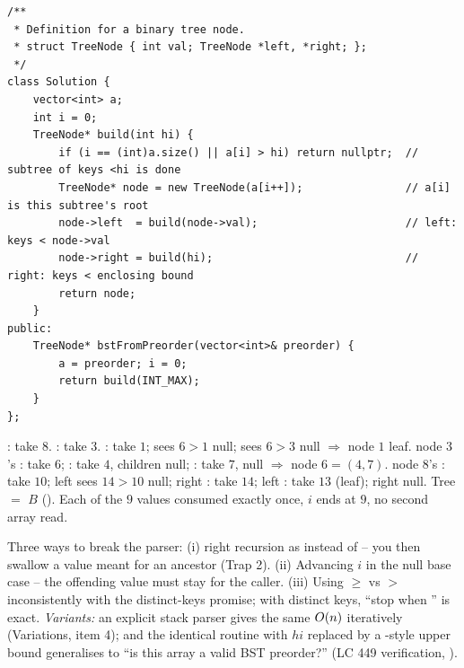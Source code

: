 \begin{lstlisting}[caption={Construct BST from Preorder Traversal -- submittable bound-descent parser (LeetCode 1008)}, label={lst:c05-construct}]
/**
 * Definition for a binary tree node.
 * struct TreeNode { int val; TreeNode *left, *right; };
 */
class Solution {
    vector<int> a;
    int i = 0;
    TreeNode* build(int hi) {
        if (i == (int)a.size() || a[i] > hi) return nullptr;  // subtree of keys <hi is done
        TreeNode* node = new TreeNode(a[i++]);                // a[i] is this subtree's root
        node->left  = build(node->val);                       // left: keys < node->val
        node->right = build(hi);                              // right: keys < enclosing bound
        return node;
    }
public:
    TreeNode* bstFromPreorder(vector<int>& preorder) {
        a = preorder; i = 0;
        return build(INT_MAX);
    }
};
\end{lstlisting}

\begin{tracebox}
: take $8$. : take $3$. : take $1$; 
sees $6>1$ null;  sees $6>3$ null $\Rightarrow$ node $1$ leaf. node $3$'s
: take $6$; : take $4$, children null; : take $7$, null
$\Rightarrow$ node $6=(4,7)$. node $8$'s : take $10$; left  sees
$14>10$ null; right : take $14$; left : take $13$ (leaf); right null.
Tree $=$ $B$ (). \checkmark Each of the $9$ values consumed exactly once, $i$ ends
at $9$, no second array read.
\end{tracebox}


\begin{warningbox}
Three ways to break the parser: (i) right recursion as  instead of
 -- you then swallow a value meant for an ancestor (Trap 2). (ii) Advancing $i$ in the
null base case -- the offending value must stay for the caller. (iii) Using $\ge$ vs $>$ inconsistently
with the distinct-keys promise; with distinct keys, ``stop when '' is exact.
\emph{Variants:} an explicit stack parser gives the same $O(n)$ iteratively (Variations, item 4);
and the identical routine with $\mathit{hi}$ replaced by a -style upper bound generalises to
``is this array a valid BST preorder?'' (LC 449 verification, ).
\end{warningbox}

